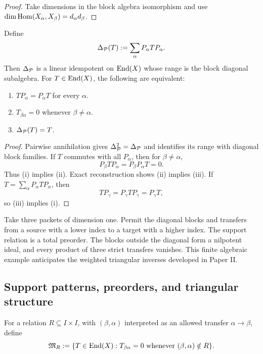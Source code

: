 \begin{proof}
Take dimensions in the block algebra isomorphism and use $\dim\operatorname{Hom}(X_\alpha,X_\beta)=d_\alpha d_\beta$.
\end{proof}

\begin{proposition}
\label{prop:block-diagonal-projection}
Define
\[
\Delta_{\mathcal P}(T):=\sum_{\alpha}P_\alpha TP_\alpha.
\]
Then $\Delta_{\mathcal P}$ is a linear idempotent on $\operatorname{End}(X)$ whose range is the block diagonal subalgebra.  For $T\in\operatorname{End}(X)$, the following are equivalent:
\begin{enumerate}[label=(\roman*)]
\item $TP_\alpha=P_\alpha T$ for every $\alpha$.
\item $T_{\beta\alpha}=0$ whenever $\beta\neq\alpha$.
\item $\Delta_{\mathcal P}(T)=T$.
\end{enumerate}
\end{proposition}

\begin{proof}
Pairwise annihilation gives $\Delta_{\mathcal P}^2=\Delta_{\mathcal P}$ and identifies its range with diagonal block families.  If $T$ commutes with all $P_\alpha$, then for $\beta\neq\alpha$,
\[
P_\beta TP_\alpha=P_\beta P_\alpha T=0.
\]
Thus (i) implies (ii).  Exact reconstruction shows (ii) implies (iii).  If $T=\sum_\alpha P_\alpha TP_\alpha$, then
\[
TP_\gamma=P_\gamma TP_\gamma=P_\gamma T,
\]
so (iii) implies (i).
\end{proof}

\begin{microexample}[title={Upper triangular support}]
Take three packets of dimension one.  Permit the diagonal blocks and transfers from a source with a lower index to a target with a higher index.  The support relation is a total preorder.  The blocks outside the diagonal form a nilpotent ideal, and every product of three strict transfers vanishes.  This finite algebraic example anticipates the weighted triangular inverses developed in Paper II.
\end{microexample}


\subsection{Support patterns, preorders, and triangular structure}
\begin{definition}
\label{def:support-relation}
For a relation $R\subseteq I\times I$, with $(\beta,\alpha)$ interpreted as an allowed transfer $\alpha\to\beta$, define
\[
\mathfrak M_R
:=
\{T\in\operatorname{End}(X):T_{\beta\alpha}=0\text{ whenever }(\beta,\alpha)\notin R\}.
\]
\end{definition}

